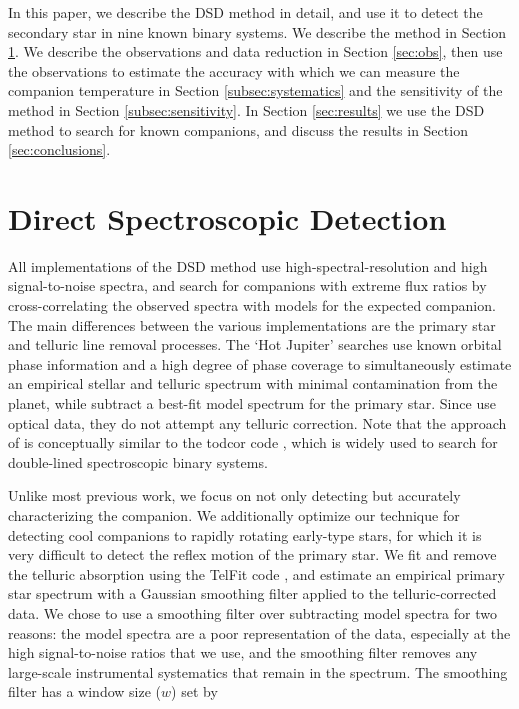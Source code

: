 \documentclass{emulateapj}
\begin{document}
In this paper, we describe the DSD method in detail, and use it to detect the secondary star in nine known binary systems. We describe the method in Section \ref{sec:method}. We describe the observations and data reduction in Section \ref{sec:obs}, then use the observations to estimate the accuracy with which we can measure the companion temperature in Section \ref{subsec:systematics} and the sensitivity of the method in Section \ref{subsec:sensitivity}. In Section \ref{sec:results} we use the DSD method to search for known companions, and discuss the results in Section \ref{sec:conclusions}.


\section{Direct Spectroscopic Detection}
\label{sec:method}

All implementations of the DSD method use high-spectral-resolution and high signal-to-noise spectra, and search for companions with extreme flux ratios by cross-correlating the observed spectra with models for the expected companion. The main differences between the various implementations are the primary star and telluric line removal processes. The `Hot Jupiter' searches \citep[e.g.][]{Snellen2010} use known orbital phase information and a high degree of phase coverage to simultaneously estimate an empirical stellar and telluric spectrum with minimal contamination from the planet, while \cite{Kolbl2015} subtract a best-fit model spectrum for the primary star. Since \cite{Kolbl2015} use optical data, they do not attempt any telluric correction. Note that the approach of \cite{Kolbl2015} is conceptually similar to the todcor code \citep{Mazeh1994}, which is widely used to search for double-lined spectroscopic binary systems.

Unlike most previous work, we focus on not only detecting but accurately characterizing the companion. We additionally optimize our technique for detecting cool companions to rapidly rotating early-type stars, for which it is very difficult to detect the reflex motion of the primary star. We fit and remove the telluric absorption using the TelFit code \citep{Gullikson2014}, and estimate an empirical primary star spectrum with a Gaussian smoothing filter applied to the telluric-corrected data. We chose to use a smoothing filter over subtracting model spectra for two reasons: the model spectra are a poor representation of the data, especially at the high signal-to-noise ratios that we use, and the smoothing filter removes any large-scale instrumental systematics that remain in the spectrum. The smoothing filter has a  window size ($w$) set by
\end{document}
